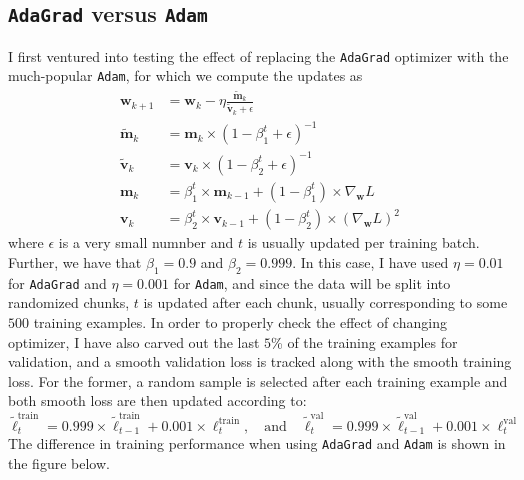 \documentclass{article}
\begin{document}
\newpage
\subsection*{\texttt{AdaGrad} versus \texttt{Adam}}
	I first ventured into testing the effect of replacing the \texttt{AdaGrad} optimizer with the much-popular \texttt{Adam}, for which we compute the updates as
	\begin{align*}
		\bm{w}_{k+1} &= \bm{w}_k - \eta\frac{\tilde{\bm{m}}_k}{\tilde{\bm{v}}_k + \epsilon} \\
		\tilde{\bm{m}}_k &= \bm{m}_k \times (1 - \beta_1^t + \epsilon)^{-1} \\
		\tilde{\bm{v}}_k &= \bm{v}_k \times (1 - \beta_2^t + \epsilon)^{-1} \\
		\bm{m}_k &= \beta_1^t \times \bm{m}_{k-1} + (1 - \beta_1^t)\times\nabla_{\bm{w}}L \\
		\bm{v}_k &= \beta_2^t \times \bm{v}_{k-1} + (1 - \beta_2^t) \times (\nabla_{\bm{w}}L)^2
	\end{align*}
	where $\epsilon$ is a very small numnber and $t$ is usually updated per training batch. Further, we have that $\beta_1 = 0.9$ and $\beta_2 = 0.999$. In this case, I have used $\eta = 0.01$ for \texttt{AdaGrad} and $\eta = 0.001$ for \texttt{Adam}, and since the data will be split into randomized chunks, $t$ is updated after each chunk, usually corresponding to some $500$ training examples. In order to properly check the effect of changing optimizer, I have also carved out the last $5$\% of the training examples for validation, and a smooth validation loss is tracked along with the smooth training loss. For the former, a random sample is selected after each training example and both smooth loss are then updated according to:
	    $$\tilde{\ell}^{\text{train}}_t = 0.999\times\tilde{\ell}^{\text{train}}_{t-1} + 0.001 \times\ell^{\text{train}}_{t}, \quad\text{and}\quad \tilde{\ell}^{\text{val}}_t = 0.999\times\tilde{\ell}^{\text{val}}_{t-1} + 0.001 \times\ell^{\text{val}}_{t}$$
	The difference in training performance when using \texttt{AdaGrad} and \texttt{Adam} is shown in the figure below.
\end{document}
